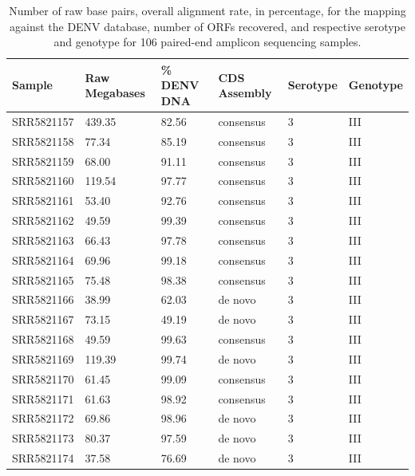 \begin{longtable}{@{}llllll@{}}
\caption{Number of raw base pairs, overall alignment rate, in percentage, for the mapping against the DENV database, number of ORFs recovered, and respective serotype and genotype for 106 paired-end amplicon sequencing samples.}
\label{tab:chap4_s4}\\
\toprule
Sample     & Raw Megabases & \% DENV DNA & CDS Assembly & Serotype & Genotype \\ \midrule
SRR5821157 & 439.35        & 82.56       & consensus    & 3        & III      \\
SRR5821158 & 77.34         & 85.19       & consensus    & 3        & III      \\
SRR5821159 & 68.00         & 91.11       & consensus    & 3        & III      \\
SRR5821160 & 119.54        & 97.77       & consensus    & 3        & III      \\
SRR5821161 & 53.40         & 92.76       & consensus    & 3        & III      \\
SRR5821162 & 49.59         & 99.39       & consensus    & 3        & III      \\
SRR5821163 & 66.43         & 97.78       & consensus    & 3        & III      \\
SRR5821164 & 69.96         & 99.18       & consensus    & 3        & III      \\
SRR5821165 & 75.48         & 98.38       & consensus    & 3        & III      \\
SRR5821166 & 38.99         & 62.03       & de novo      & 3        & III      \\
SRR5821167 & 73.15         & 49.19       & de novo      & 3        & III      \\
SRR5821168 & 49.59         & 99.63       & consensus    & 3        & III      \\
SRR5821169 & 119.39        & 99.74       & de novo      & 3        & III      \\
SRR5821170 & 61.45         & 99.09       & consensus    & 3        & III      \\
SRR5821171 & 61.63         & 98.92       & consensus    & 3        & III      \\
SRR5821172 & 69.86         & 98.96       & de novo      & 3        & III      \\
SRR5821173 & 80.37         & 97.59       & de novo      & 3        & III      \\
SRR5821174 & 37.58         & 76.69       & de novo      & 3        & III      \\

\end{longtable}
